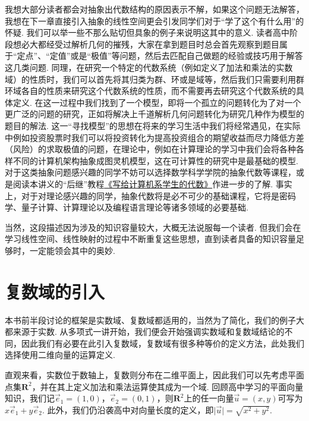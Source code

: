我想大部分读者都会对抽象出代数结构的原因表示不解，如果这个问题无法解答，我想在下一章直接引入抽象的线性空间更会引发同学们对于``学了这个有什么用''的怀疑. 我们可以举一些不那么贴切但具象的例子来说明这其中的意义. 读者高中阶段想必大都经受过解析几何的摧残，大家在拿到题目时总会首先观察到题目属于``定点''、``定值''或是``极值''等问题，然后去匹配自己做题的经验或技巧用于解答这几类问题. 同理，在研究一个特定的代数系统（例如定义了加法和乘法的实数域）的性质时，我们可以首先将其归类为群、环或是域等，然后我们只需要利用群环域各自的性质来研究这个代数系统的性质，而不需要再去研究这个代数系统的具体定义. 在这一过程中我们找到了一个模型，即将一个孤立的问题转化为了对一个更广泛的问题的研究，正如将解决上千道解析几何问题转化为研究几种作为模型的题目的解法. 这一``寻找模型''的思想在将来的学习生活中我们将经常遇见，在实际中例如投资股票时我们可以将投资转化为提高投资组合的期望收益而尽力降低方差（风险）的求取极值的问题，在理论中，例如在计算理论的学习中我们会将各种各样不同的计算机架构抽象成图灵机模型，这在可计算性的研究中是最基础的模型. 对于这类抽象问题感兴趣的同学不妨可以选择数学科学学院的抽象代数等课程，或是阅读本讲义的``后继''教程\href{https://frightenedfoxcn.github.io/notes/series/alg-for-cs/}{《写给计算机系学生的代数》}作进一步的了解. 事实上，对于对理论感兴趣的同学，抽象代数将是必不可少的基础课程，它将是密码学、量子计算、计算理论以及编程语言理论等诸多领域的必要基础.

当然，这段描述因为涉及的知识容量较大，大概无法说服每一个读者. 但我们会在学习线性空间、线性映射的过程中不断重复这些思想，直到读者具备的知识容量足够时，一定能领会其中的奥妙.

\section{复数域的引入}

本书前半段讨论的框架是实数域、复数域都适用的，当然为了简化，我们的例子大都来源于实数. 从多项式一讲开始，我们便会开始强调实数域和复数域结论的不同，因此我们有必要在此引入复数域，复数域有很多种等价的定义方法，此处我们选择使用二维向量的运算定义.

直观来看，实数位于数轴上，复数则分布在二维平面上，因此我们可以先考虑平面点集$\mathbf{R}^2$，并在其上定义加法和乘法运算使其成为一个域. 回顾高中学习的平面向量知识，我们记$\vec{e}_1=(1,0)$，$\vec{e}_2=(0,1)$，则$\mathbf{R}^2$上的任一向量$\vec{u}=(x,y)$可写为$x\vec{e}_1+y\vec{e}_2$. 此外，我们仍沿袭高中对向量长度的定义，即$\lvert\vec{u}\rvert=\sqrt{x^2+y^2}$.

